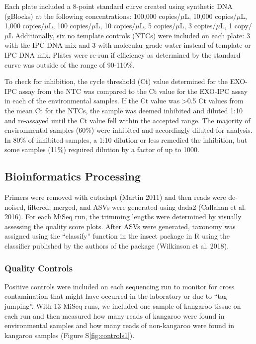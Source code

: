 \documentclass[
]{article}
\begin{document}
Each plate included a 8-point standard curve created using synthetic DNA
(gBlocks) at the following concentrations: 100,000 copies/\(\mu\)L,
10,000 copies/\(\mu\)L, 1,000 copies/\(\mu\)L, 100 copies/\(\mu\)L, 10
copies/\(\mu\)L, 5 copies/\(\mu\)L, 3 copies/\(\mu\)L, 1 copy/\(\mu\)L
Additionally, six no template controls (NTCs) were included on each
plate: 3 with the IPC DNA mix and 3 with molecular grade water instead
of template or IPC DNA mix. Plates were re-run if efficiency as
determined by the standard curve was outside of the range of 90-110\%.

To check for inhibition, the cycle threshold (Ct) value determined for
the EXO-IPC assay from the NTC was compared to the Ct value for the
EXO-IPC assay in each of the environmental samples. If the Ct value was
\textgreater0.5 Ct values from the mean Ct for the NTCs, the sample was
deemed inhibited and diluted 1:10 and re-assayed until the Ct value fell
within the accepted range. The majority of environmental samples (60\%)
were inhibited and accordingly diluted for analysis. In 80\% of
inhibited samples, a 1:10 dilution or less remedied the inhibition, but
some samples (11\%) required dilution by a factor of up to 1000.

\hypertarget{bioinformatics-processing}{%
\subsection{Bioinformatics Processing}\label{bioinformatics-processing}}

Primers were removed with cutadapt (Martin 2011) and then reads were
de-noised, filtered, merged, and ASVs were generated using dada2
(Callahan et al. 2016). For each MiSeq run, the trimming lengths were
determined by visually assessing the quality score plots. After ASVs
were generated, taxonomy was assigned using the ``classify'' function in
the insect package in R using the classifier published by the authors of
the package (Wilkinson et al. 2018).

\hypertarget{quality-controls}{%
\subsubsection{Quality Controls}\label{quality-controls}}

Positive controls were included on each sequencing run to monitor for
cross contamination that might have occurred in the laboratory or due to
``tag jumping''. With 13 MiSeq runs, we included one sample of kangaroo
tissue on each run and then measured how many reads of kangaroo were
found in environmental samples and how many reads of non-kangaroo were
found in kangaroo samples (Figure S\ref{fig:controls1}).
\end{document}
